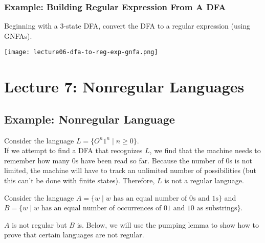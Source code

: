 \documentclass[11pt,a4paper]{article}
\begin{document}
\subsubsection{Example: Building Regular Expression From A DFA}
\begin{example}
    Beginning with a 3-state DFA, convert the DFA to a regular expression (using GNFAs).

    \texttt{[image: lecture06-dfa-to-reg-exp-gnfa.png]}
\end{example}





\section{Lecture 7: Nonregular Languages}

\subsection{Example: Nonregular Language}
\begin{example}
    Consider the language $L=\{O^n1^n\mid n\geq 0\}$. \\

    If we attempt to find a DFA that recognizes $L$, we find that the machine needs to remember how many 0s have been read so far.
    Because the number of 0s is not limited, the machine will have to track an unlimited number of possibilities (but this can't be done with finite states).
    Therefore, $L$ is not a regular language.
\end{example}

\begin{example}
    Consider the language $A=\{w\mid w\text{ has an equal number of 0s and 1s}\}$ and $B=\{w\mid w\text{ has an equal number of occurrences of 01 and 10 as substrings}\}$.

    $A$ is not regular but $B$ is. Below, we will use the pumping lemma to show how to prove that certain languages are not regular.
\end{example}
\end{document}
